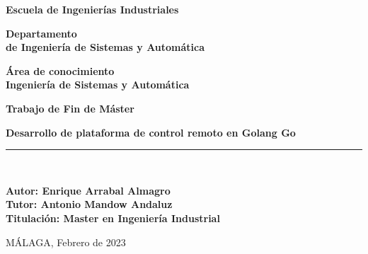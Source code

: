 \begin{center}
	\begin{large}
		\textbf {Escuela de Ingenierías Industriales\\}
	\end{large}	
	\vspace*{0.5cm}
	\begin{large}
		\textbf {Departamento\\ de Ingeniería de Sistemas y Automática\\}
	\end{large}	
	\vspace*{1cm}
	\begin{large}
		\textbf {Área de conocimiento\\Ingeniería de Sistemas y Automática\\}
	\end{large}	
	\vspace*{1cm}	
	\begin{Huge}
		\textbf {Trabajo de Fin de Máster\\}
	\end{Huge}
	\vspace*{0.3cm}
	\begin{LARGE}
		\textbf {Desarrollo de plataforma de control remoto en Golang Go\\}
	\end{LARGE}
	\vspace*{0.3cm}
	\rule{5cm}{0.01cm}\\
	\vspace*{1cm}
	\begin{large}
		\textbf {Autor: Enrique Arrabal Almagro\\}
		\vspace*{0.5cm}
		\textbf {Tutor: Antonio Mandow Andaluz\\}
		\vspace*{1cm}
		\textbf{Titulación: Master en Ingeniería Industrial}
	\end{large}	
	\vspace*{3cm}
\begin{center}
\textbf{}{MÁLAGA, Febrero de 2023}
\end{center}					
\end{center}
\thispagestyle{empty}

